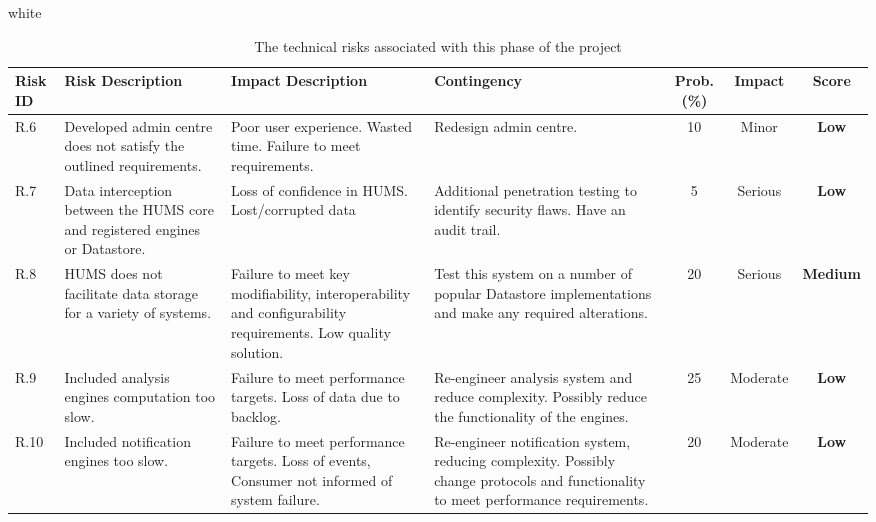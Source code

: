 \documentclass[10pt,a4paper]{article}
\newcommand{\xtableformat}[4]{
\begin{table}[ht!]
\centering
  \rowcolors{2}{gray!10} {white}
\begin{tabularx}{\textwidth}{#1}
  \hline
  \rowcolor[gray]{0.9} #2
  \hline
\end{tabularx}
\caption{#3}
\label{#4}
\end{table}}
\begin{document}
\xtableformat{p{0.8cm} X X X c c c}
{ 	\hline
    Risk ID & Risk Description & Impact Description & Contingency & Prob.(\%) & Impact & Score \\
  	\hline
  
    R.6 & Developed admin centre does not satisfy the outlined requirements. & Poor user experience. Wasted time. Failure to meet requirements. & Redesign admin centre. & 10 & Minor & \textbf{Low} \\
    R.7 & Data interception between the HUMS core and registered engines or Datastore. & Loss of confidence in HUMS. Lost/corrupted data & Additional penetration testing to identify security flaws. Have an audit trail. & 5 & Serious &  \textbf{Low} \\
    R.8 & HUMS does not facilitate data storage for a variety of systems. & Failure to meet key modifiability, interoperability and configurability requirements. Low quality solution. &  Test this system on a number of popular Datastore implementations and make any required alterations. & 20 & Serious & \textbf{Medium} \\
    R.9 & Included analysis engines computation too slow. & Failure to meet performance targets. Loss of data due to backlog. & Re-engineer analysis system and reduce complexity. Possibly reduce the functionality of the engines. & 25 & Moderate & \textbf{Low} \\	
    R.10 & Included notification engines too slow. & Failure to meet performance targets. Loss of events, Consumer not informed of system failure. & Re-engineer notification system, reducing complexity. Possibly change protocols and functionality to meet performance requirements. & 20 & Moderate & \textbf{Low} \\	
}
{The technical risks associated with this phase of the project}{tab:tech_risks}
\end{document}
